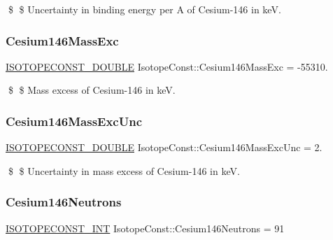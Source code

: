 \$ \$ Uncertainty in binding energy per A of Cesium-\/146 in keV. \mbox{\label{group___isotope_const-_cesium-_cs146_gacccf32f0f5db9efd411bee863ccb4b8d}} 
\subsubsection{\texorpdfstring{Cesium146\+Mass\+Exc}{Cesium146MassExc}}
{\footnotesize\ttfamily \mbox{\hyperlink{group___isotope_const-_macros_ga8f45a7272ce02c0b4c65c44636ed719a}{I\+S\+O\+T\+O\+P\+E\+C\+O\+N\+S\+T\+\_\+\+D\+O\+U\+B\+LE}} Isotope\+Const\+::\+Cesium146\+Mass\+Exc = -\/55310.}

\$ \$ Mass excess of Cesium-\/146 in keV. \mbox{\label{group___isotope_const-_cesium-_cs146_ga7199f5903f31caf390eb71ce079d0f97}} 
\subsubsection{\texorpdfstring{Cesium146\+Mass\+Exc\+Unc}{Cesium146MassExcUnc}}
{\footnotesize\ttfamily \mbox{\hyperlink{group___isotope_const-_macros_ga8f45a7272ce02c0b4c65c44636ed719a}{I\+S\+O\+T\+O\+P\+E\+C\+O\+N\+S\+T\+\_\+\+D\+O\+U\+B\+LE}} Isotope\+Const\+::\+Cesium146\+Mass\+Exc\+Unc = 2.}

\$ \$ Uncertainty in mass excess of Cesium-\/146 in keV. \mbox{\label{group___isotope_const-_cesium-_cs146_gabd1a82d0d8426f7098666df45babdc9f}} 
\subsubsection{\texorpdfstring{Cesium146\+Neutrons}{Cesium146Neutrons}}
{\footnotesize\ttfamily \mbox{\hyperlink{group___isotope_const-_macros_ga5f18360b3e99483a35c32d789e62621c}{I\+S\+O\+T\+O\+P\+E\+C\+O\+N\+S\+T\+\_\+\+I\+NT}} Isotope\+Const\+::\+Cesium146\+Neutrons = 91}

